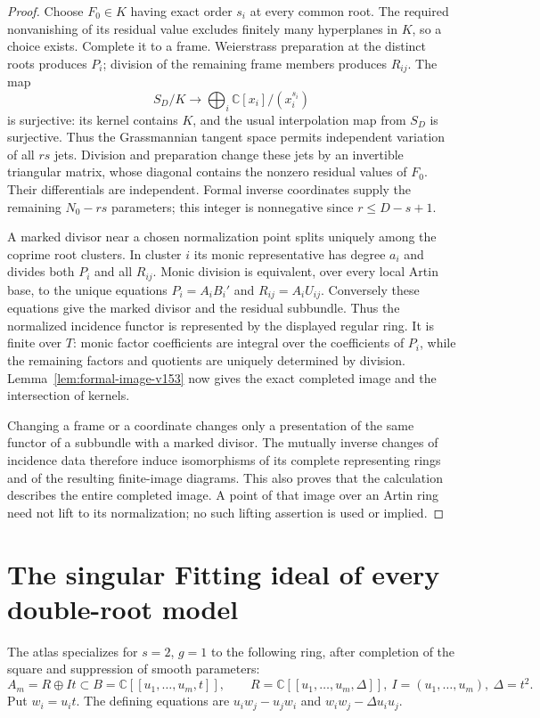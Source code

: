 \documentclass[11pt,reqno]{amsart}
\numberwithin{equation}{section}
\theoremstyle{definition}\newtheorem{definition}[theorem]{Definition}
\theoremstyle{remark}\newtheorem{remark}[theorem]{Remark}
\newcommand{\C}{\mathbb C}\newcommand{\Q}{\mathbb Q}
\begin{document}
\begin{proof}
Choose $F_0\in K$ having exact order $s_i$ at every common root.
The required nonvanishing of its residual value excludes finitely
many hyperplanes in $K$, so a choice exists. Complete it to a frame.
Weierstrass preparation at the distinct roots produces $P_i$; division
of the remaining frame members produces $R_{ij}$. The map
\[
 S_D/K\longrightarrow\bigoplus_i\C[x_i]/(x_i^{s_i})
\]
is surjective: its kernel contains $K$, and the usual interpolation
map from $S_D$ is surjective. Thus the Grassmannian tangent space
permits independent variation of all $rs$ jets. Division and preparation
change these jets by an invertible triangular matrix, whose diagonal
contains the nonzero residual values of $F_0$. Their differentials
are independent. Formal inverse coordinates supply the remaining
$N_0-rs$ parameters; this integer is nonnegative since
$r\leq D-s+1$.

A marked divisor near a chosen normalization point splits uniquely
among the coprime root clusters. In cluster $i$ its monic representative
has degree $a_i$ and divides both $P_i$ and all $R_{ij}$. Monic division
is equivalent, over every local Artin base, to the unique equations
$P_i=A_iB_i'$ and $R_{ij}=A_iU_{ij}$. Conversely these equations give
the marked divisor and the residual subbundle. Thus the normalized
incidence functor is represented by the displayed regular ring.
It is finite over $T$: monic factor coefficients are integral over the
coefficients of $P_i$, while the remaining factors and quotients are
uniquely determined by division. Lemma~\ref{lem:formal-image-v153}
now gives the exact completed image and the intersection of kernels.

Changing a frame or a coordinate changes only a presentation of the
same functor of a subbundle with a marked divisor. The mutually inverse
changes of incidence data therefore induce isomorphisms of its complete
representing rings and of the resulting finite-image diagrams. This
also proves that the calculation describes the entire completed image.
A point of that image over an Artin ring need not lift to its
normalization; no such lifting assertion is used or implied.
\end{proof}


\section{The singular Fitting ideal of every double-root model}
\label{sec:fitting-v153}
The atlas specializes for $s=2$, $g=1$ to the following ring, after
completion of the square and suppression of smooth parameters:
\[
 A_m=R\oplus It\subset B=\C[[u_1,\ldots,u_m,t]],\qquad
 R=\C[[u_1,\ldots,u_m,\Delta]],\ I=(u_1,\ldots,u_m),\ \Delta=t^2.
\]
Put $w_i=u_it$. The defining equations are
$u_iw_j-u_jw_i$ and $w_iw_j-\Delta u_iu_j$.
\end{document}
